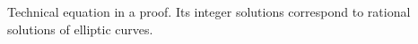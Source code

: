 Technical equation in a proof. Its integer solutions correspond to rational solutions of elliptic curves.
